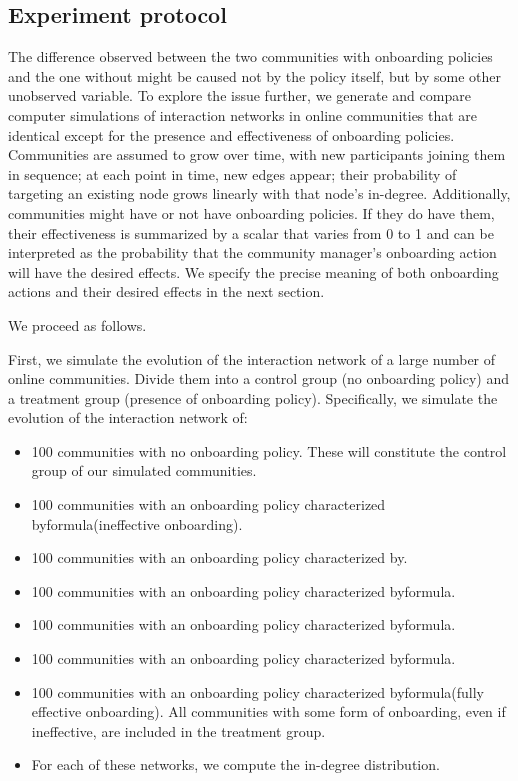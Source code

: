 \subsection{Experiment protocol}
The difference observed between the two communities with onboarding policies and the one without might be caused not by the policy itself, but by some other unobserved variable. To explore the issue further, we generate and compare computer simulations of interaction networks in online communities that are identical except for the presence and effectiveness of onboarding policies. Communities are assumed to grow over time, with new participants joining them in sequence; at each point in time, new edges appear; their probability of targeting an existing node grows linearly with that node's in-degree. Additionally, communities might have or not have onboarding policies. If they do have them, their effectiveness is summarized by a scalar that varies from 0 to 1 and can be interpreted as the probability that the community manager's onboarding action will have the desired effects. We specify the precise meaning of both onboarding actions and their desired effects in the next section.

We proceed as follows.

First, we simulate the evolution of the interaction network of a large number of online communities. Divide them into a control group (no onboarding policy) and a treatment group (presence of onboarding policy). Specifically, we simulate the evolution of the interaction network of:

\begin{itemize}
\item 100 communities with no onboarding policy. These will constitute the control group of our simulated communities. 
\item 100 communities with an onboarding policy characterized byformula(ineffective onboarding). 
\item 100 communities with an onboarding policy characterized by.
\item 100 communities with an onboarding policy characterized byformula. 
\item 100 communities with an onboarding policy characterized byformula. 
\item 100 communities with an onboarding policy characterized byformula. 
\item 100 communities with an onboarding policy characterized byformula(fully effective onboarding). All communities with some form of onboarding, even if ineffective, are included in the treatment group.
\item For each of these networks, we compute the in-degree distribution.
\end{itemize}

